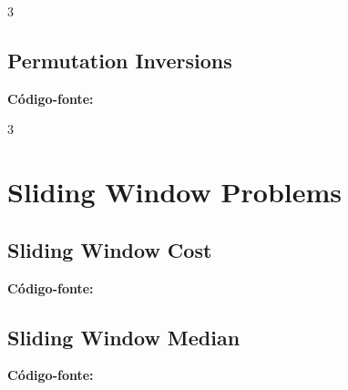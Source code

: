 \documentclass[8pt]{extarticle}
\begin{document}
\begin{multicols*}{3}
\subsection{Permutation Inversions}
\begin{caixaenunciado}

\end{caixaenunciado}
\vspace{0.3cm}
\noindent\textbf{Código-fonte:}

\end{multicols*}
\pagebreak
\begin{multicols*}{3}

\section{Sliding Window Problems}

\subsection{Sliding Window Cost}
\begin{caixaenunciado}

\end{caixaenunciado}
\vspace{0.3cm}
\noindent\textbf{Código-fonte:}


\subsection{Sliding Window Median}
\begin{caixaenunciado}

\end{caixaenunciado}
\vspace{0.3cm}
\noindent\textbf{Código-fonte:}

\end{multicols*}
\pagebreak
\end{document}
